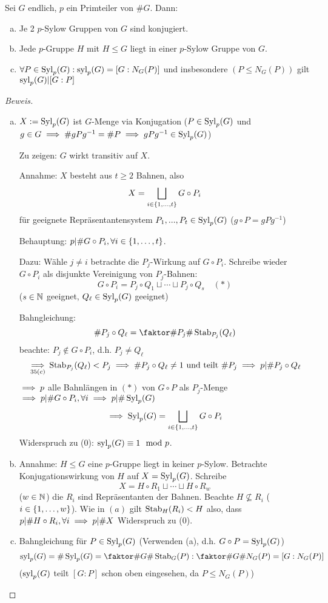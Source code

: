 \documentclass[a4paper]{report}
\begin{document}
\begin{satz}
  Sei $G$ endlich, $p$ ein Primteiler von $\#G$. Dann:
  \begin{enumerate}[(a)]
    \item Je 2 $p$-Sylow Gruppen von $G$ sind konjugiert.
    \item Jede $p$-Gruppe $H$ mit $H \le G$ liegt in einer $p$-Sylow Gruppe von $G$.
    \item $\forall P \in \operatorname{Syl}_{p}(G): \operatorname{syl}_{p}(G) = [G : N_{G}(P)]$ und insbesondere $(P \le N_{G}(P))$ gilt $\operatorname{syl}_{p}(G) | [G : P]$
  \end{enumerate}
  \begin{proof}[Beweis]
    \begin{enumerate}[(a)]
      \item $X:= \operatorname{Syl}_{p}(G)$ ist $G$-Menge via Konjugation ($P \in \operatorname{Syl}_{p}(G)$ und $g \in G \implies \#gPg^{-1} = \#P \implies gPg^{-1} \in \operatorname{Syl}_{p}(G)$)

      Zu zeigen: $G$ wirkt transitiv auf $X$.

      Annahme: $X$ besteht aus $t \ge 2$ Bahnen, also \[X = \bigsqcup_{i \in \{1, \ldots, t\}} G \circ P_{i}\]
      für geeignete Repräsentantensystem $P_{1}, ..., P_{t} \in \operatorname{Syl}_{p}(G)$ ($g \circ P = gPg^{-1}$)

      Behauptung: $p | \#G \circ P_{i}, \forall i \in \{1, \ldots, t\}$.

      Dazu: Wähle $j \ne i$ betrachte die $P_{j}$-Wirkung auf $G \circ P_{i}$. Schreibe wieder $G \circ P_{i}$ als disjunkte Vereinigung von $P_{j}$-Bahnen:
      \[G \circ P_{i} = P_{j} \circ Q_{1} \sqcup \cdots \sqcup P_{j}\circ Q_{s} \quad (*)\]
      ($s \in \mathbb{N}$ geeignet, $Q_{\ell} \in \operatorname{Syl}_{p}(G)$ geeignet)

      Bahngleichung:
      \[\#P_{j}\circ Q_{\ell} = \fak{\#P_{j}}{\#\stb_{P_{j}}(Q_{\ell})}\]
      beachte: $P_{j} \notin G \circ P_{i}$, d.h. $P_{j} \ne Q_{\ell}$
      \[\underset{35(c)} {\implies} \operatorname{Stab}_{P_{j}}(Q_{\ell}) < P_{j} \implies \#P_{j} \circ Q_{\ell} \ne 1 \text{ und teilt } \#P_{j} \implies p | \#P_{j}\circ Q_{\ell}\]
      $\implies p$ alle Bahnlängen in $(*)$ von $G \circ P$ als $P_{j}$-Menge $\implies p | \#G \circ P_{i}, \forall i \implies p | \#\operatorname{Syl}_{p}(G)$
      \[\implies \operatorname{Syl}_{p}(G) = \bigsqcup_{i \in \{1, \ldots, t\}}G \circ P_{i}\]
      Widerspruch zu (0): $\operatorname{syl}_{p}(G) \equiv 1 \mod p$.
      \item Annahme: $H \le G$ eine $p$-Gruppe liegt in keiner $p$-Sylow. Betrachte Konjugationswirkung von $H$ auf $X = \operatorname{Syl}_{p}(G)$. Schreibe
            \[X= H \circ R_{1} \sqcup \cdots \sqcup H \circ R_{w}\]
            ($w \in \mathbb{N}$) die $R_{i}$ sind Repräsentanten der Bahnen. Beachte $H \nsubseteq R_{i}$ ($i \in \{1, \ldots, w\}$). Wie in $(a)$ gilt $\operatorname{Stab}_{H}(R_{i}) < H$ also, dass $p | \#H \circ R_{i}, \forall i \implies p | \#X$ Widerspruch zu (0).
      \item Bahngleichung für $P \in \operatorname{Syl}_{p}(G)$
            (Verwenden (a), d.h. $G \circ P = \operatorname{Syl}_{p}(G)$)
            \[\syl_{p}(G)=\#\Syl_{p}(G) = \fak {\#G}{\#\stb_{G}(P)} : \fak {\#G}{\#N_{G}(P)} = [G : N_{G}(P)]\]
            ($\operatorname{syl}_{p}(G)$ teilt $[G: P]$ schon oben eingesehen, da $P \le N_{G}(P)$)
    \end{enumerate}


\end{proof}
\end{satz}
\end{document}
